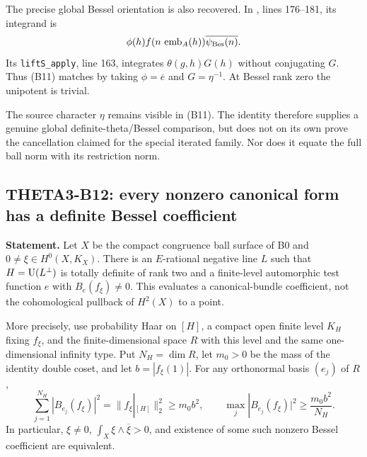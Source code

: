 \documentclass[11pt]{article}
\theoremstyle{definition}\newtheorem{definition}[theorem]{Definition}\newtheorem{remark}[theorem]{Remark}
\begin{document}
The precise global Bessel orientation is also recovered. In
, lines 176--181, its integrand is
\[
 \phi(h)f(n\,\operatorname{emb}_A(h))\overline{\psi_{\rm Bes}(n)}.
\]
Its \texttt{liftS\_apply}, line 163, integrates $\theta(g,h)G(h)$ without conjugating $G$. Thus (B11) matches by taking $\phi=\overline e$ and $G=\eta^{-1}$. At Bessel rank zero the unipotent is trivial.

The source character $\eta$ remains visible in (B11). The identity therefore supplies a genuine global definite-theta/Bessel comparison, but does not on its own prove the cancellation claimed for the special iterated family. Nor does it equate the full ball norm with its restriction norm.

\subsection{THETA3-B12: every nonzero canonical form has a definite Bessel coefficient}\label{B12}

\textbf{Statement.} Let $X$ be the compact congruence ball surface of B0 and $0\ne\xi\in H^0(X,K_X)$. There is an $E$-rational negative line $L$ such that $H=\operatorname{U}(L^\perp)$ is totally definite of rank two and a finite-level automorphic test function $e$ with $B_e(f_\xi)\ne0$. This evaluates a canonical-bundle coefficient, not the cohomological pullback of $H^2(X)$ to a point.

More precisely, use probability Haar on $[H]$, a compact open finite level $K_H$ fixing $f_\xi$, and the finite-dimensional space $R$ with this level and the same one-dimensional infinity type. Put $N_H=\dim R$, let $m_0>0$ be the mass of the identity double coset, and let $b=|f_\xi(1)|$. For any orthonormal basis $(e_j)$ of $R$,
\[
 \sum_{j=1}^{N_H}|B_{e_j}(f_\xi)|^2
      =\|f_\xi|_{[H]}\|_2^2\geq m_0b^2,
 \qquad
 \max_j|B_{e_j}(f_\xi)|^2\geq\frac{m_0b^2}{N_H}.
 \tag{B12}
\]
In particular, $\xi\ne0$, $\int_X\xi\wedge\overline\xi>0$, and existence of some such nonzero Bessel coefficient are equivalent.
\end{document}
